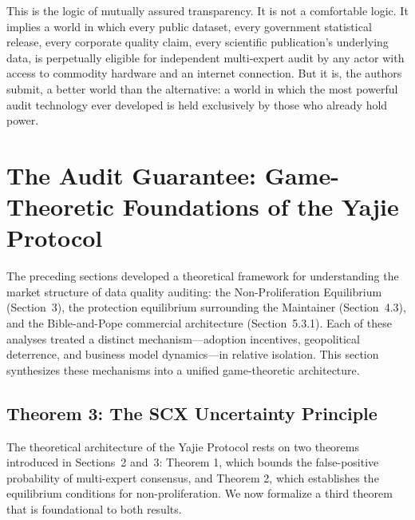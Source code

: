 \documentclass[12pt,a4paper]{ctexart}
\theoremstyle{definition}
\theoremstyle{remark}
\begin{document}
This is the logic of mutually assured transparency. It is not a comfortable logic. It implies a world in which every public dataset, every government statistical release, every corporate quality claim, every scientific publication's underlying data, is perpetually eligible for independent multi-expert audit by any actor with access to commodity hardware and an internet connection. But it is, the authors submit, a better world than the alternative: a world in which the most powerful audit technology ever developed is held exclusively by those who already hold power.

\section{The Audit Guarantee: Game-Theoretic Foundations of the Yajie Protocol}

The preceding sections developed a theoretical framework for understanding the market structure of data quality auditing: the Non-Proliferation Equilibrium (Section~3), the protection equilibrium surrounding the Maintainer (Section~4.3), and the Bible-and-Pope commercial architecture (Section~5.3.1). Each of these analyses treated a distinct mechanism—adoption incentives, geopolitical deterrence, and business model dynamics—in relative isolation. This section synthesizes these mechanisms into a unified game-theoretic architecture.

\subsection{Theorem 3: The SCX Uncertainty Principle}

The theoretical architecture of the Yajie Protocol rests on two theorems introduced in Sections~2 and~3: Theorem 1, which bounds the false-positive probability of multi-expert consensus, and Theorem 2, which establishes the equilibrium conditions for non-proliferation. We now formalize a third theorem that is foundational to both results.
\end{document}
